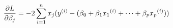 \documentclass[preview]{standalone}
\begin{document}
\begin{align*}
{\special{dvisvgm:raw <g id='unique000'>}\frac{\partial L}{\partial \beta_j}=-2\sum_{i=1}^n{x_j(y^{(i)}-(\beta_0+\beta_1 {x_1}^{(i)}+\dots+\beta_p {x_p}^{(i)}}))}\special{dvisvgm:raw </g>}
\end{align*}
\end{document}
